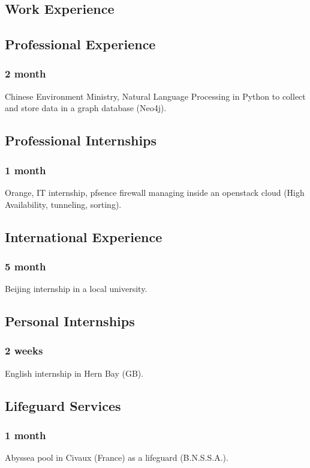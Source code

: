 \documentclass{article}
\begin{document}
    \vspace{1cm}

    \begin{multicols}{2}
        \section{Work Experience}
            \subsection{Professional Experience}
                \subsubsection{2 month}
                    Chinese Environment Ministry, Natural Language Processing in Python to collect and store data in a graph database (Neo4j).
            \subsection{Professional Internships}
                \subsubsection{1 month}
                    Orange, IT internship, pfsence firewall managing inside an openstack cloud (High Availability, tunneling, sorting).
            \subsection{International Experience}
                \subsubsection{5 month}
                    Beijing internship in a local university.
            \subsection{Personal Internships}
                \subsubsection{2 weeks}
                    English internship in Hern Bay (GB).
            \subsection{Lifeguard Services}
                \subsubsection{1 month}
                    Abyssea pool in Civaux (France) as a lifeguard (B.N.S.S.A.).


\end{multicols}
\end{document}
